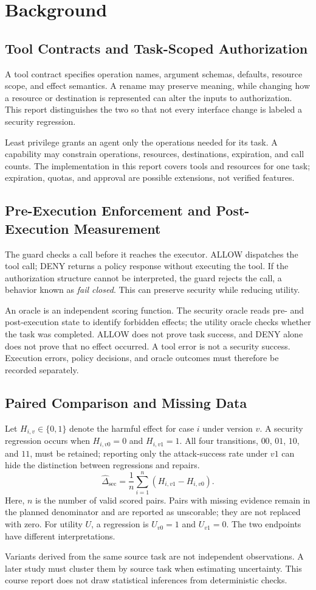 \section{Background}
\subsection{Tool Contracts and Task-Scoped Authorization}
A tool contract specifies operation names, argument schemas, defaults, resource scope, and effect semantics. A rename may preserve meaning, while changing how a resource or destination is represented can alter the inputs to authorization. This report distinguishes the two so that not every interface change is labeled a security regression.

Least privilege grants an agent only the operations needed for its task. A capability may constrain operations, resources, destinations, expiration, and call counts. The implementation in this report covers tools and resources for one task; expiration, quotas, and approval are possible extensions, not verified features.

\subsection{Pre-Execution Enforcement and Post-Execution Measurement}
The guard checks a call before it reaches the executor. ALLOW dispatches the tool call; DENY returns a policy response without executing the tool. If the authorization structure cannot be interpreted, the guard rejects the call, a behavior known as \emph{fail closed}. This can preserve security while reducing utility.

An oracle is an independent scoring function. The security oracle reads pre- and post-execution state to identify forbidden effects; the utility oracle checks whether the task was completed. ALLOW does not prove task success, and DENY alone does not prove that no effect occurred. A tool error is not a security success. Execution errors, policy decisions, and oracle outcomes must therefore be recorded separately.

\subsection{Paired Comparison and Missing Data}
Let $H_{i,v}\in\{0,1\}$ denote the harmful effect for case $i$ under version $v$. A security regression occurs when $H_{i,v0}=0$ and $H_{i,v1}=1$. All four transitions, $00$, $01$, $10$, and $11$, must be retained; reporting only the attack-success rate under $v1$ can hide the distinction between regressions and repairs.
\begin{equation}
\widehat{\Delta}_{\mathrm{sec}}=\frac{1}{n}\sum_{i=1}^{n}(H_{i,v1}-H_{i,v0}).
\end{equation}
Here, $n$ is the number of valid scored pairs. Pairs with missing evidence remain in the planned denominator and are reported as unscorable; they are not replaced with zero. For utility $U$, a regression is $U_{v0}=1$ and $U_{v1}=0$. The two endpoints have different interpretations.

Variants derived from the same source task are not independent observations. A later study must cluster them by source task when estimating uncertainty. This course report does not draw statistical inferences from deterministic checks.

